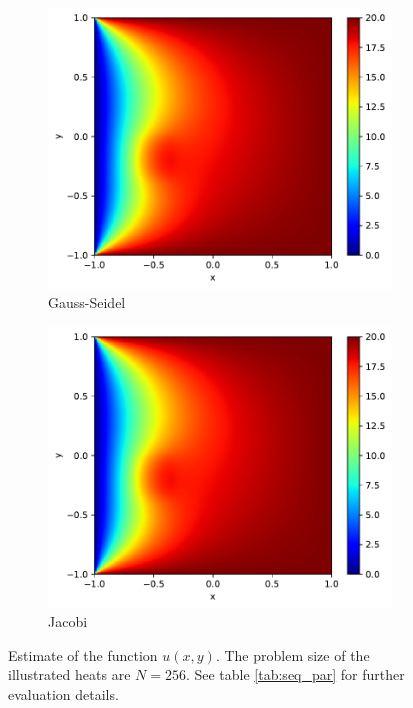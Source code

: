 \begin{figure}[!th]
\centering
\begin{subfigure}{.5\textwidth}
  \centering
  \includegraphics[width=.9\linewidth]{data_2/plots/gaus_con.pdf}
  \caption{Gauss-Seidel}
  \label{fig:}
\end{subfigure}%
\begin{subfigure}{.5\textwidth}
  \centering
  \includegraphics[width=.9\linewidth]{data_2/plots/jac_con.pdf}
  \caption{Jacobi}
  \label{fig:}
\end{subfigure}
\caption{Estimate of the function $u(x,y)$. The problem size of the illustrated heats are $N=256$. See table \ref{tab:seq_par} for further evaluation details.}
\label{fig:test}
\end{figure}

